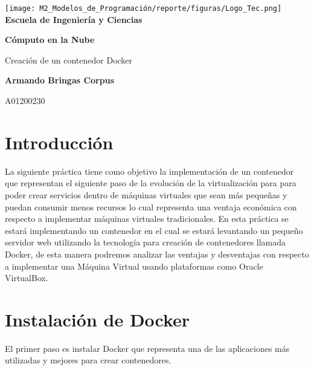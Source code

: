\documentclass[12pt,a4paper]{article}
\begin{document}
\begin{titlepage}
    \centering
    \texttt{[image: M2\_Modelos\_de\_Programación/reporte/figuras/Logo\_Tec.png]}\\
    \vspace{.5cm}
    \bfseries\large Escuela de Ingeniería y Ciencias
        
    \vspace{5cm}
    \centering
    \textbf{\Huge Cómputo en la Nube}
    \vspace{0.5cm}
        
    {\Large Creación de un contenedor Docker}

    \vspace{5cm}
        
    \textbf{\LARGE Armando Bringas Corpus}
        
    \vspace{0.5cm}
        
    {\large A01200230}
        
    \vfill
        
\end{titlepage}

\section{Introducción}

La siguiente práctica tiene como objetivo la implementación de un contenedor que representan el siguiente paso de la evolución de la virtualización para para poder crear servicios dentro de máquinas virtuales que sean más pequeñas y puedan consumir menos recursos lo cual representa una ventaja económica con respecto a implementar máquinas virtuales tradicionales. En esta práctica se estará implementando un contenedor en el cual se estará levantando un pequeño servidor web utilizando la tecnología para creación de contenedores llamada Docker, de esta manera podremos analizar las ventajas y desventajas con respecto a implementar una Máquina Virtual usando plataformas como Oracle VirtualBox.


\section{Instalación de Docker}

El primer paso es instalar Docker que representa una de las aplicaciones más utilizadas y mejores para crear contenedores. 
\end{document}
